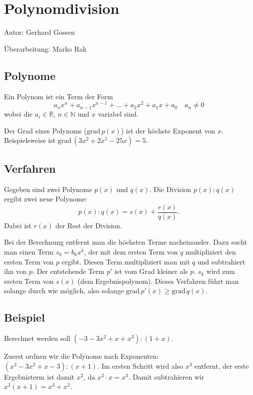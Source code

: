 \newcommand{\grad}{\ensuremath{\text{grad}\,}}
\newcommand{\halb}{\tfrac{1}{2}}
\section{Polynomdivision}

	Autor: Gerhard Gossen
	
\noindent	\"Uberarbeitung: Marko Rak
	
	\subsection{Polynome}
	
		Ein Polynom ist ein Term der Form
		\[a_nx^n + a_{n-1}x^{n-1} + \dots + a_2x^2 + a_1x + a_0 \quad a_n \neq 0\]
		wobei die $a_i \in \mathbb{R}$, $n \in \mathbb{N}$ und $x$ variabel sind.
		
		Der Grad eines Polynoms ($\grad p(x)$) ist der höchste Exponent von
		$x$. Beispielsweise ist $\grad(3x^2+2x^5-25x) = 5$.
		
	\subsection{Verfahren}
		
		Gegeben sind zwei Polynome $p(x)$ und $q(x)$. Die Division
		$p(x) : q(x)$ ergibt zwei neue Polynome:
		\[p(x) : q(x) = s(x) + \frac{r(x)}{q(x)}.\]
		Dabei ist $r(x)$ der \glqq Rest\grqq{} der Division.
		
		Bei der Berechnung entfernt man die höchsten Terme nacheinander. Dazu sucht
		man einen Term $s_k = b_kx^k$, der mit dem ersten Term von $q$ multipliziert
		den ersten Term von $p$ ergibt. Diesen Term multipliziert man mit $q$ und
		subtrahiert ihn von $p$. Der entstehende Term $p'$ ist vom Grad kleiner als
		$p$. $s_k$ wird zum ersten Term von $s(x)$ (dem \glqq Ergebnispolynom\grqq).
		Dieses Verfahren führt man solange durch wie möglich, also solange
		$\grad p'(x) \geq \grad q(x)$.
		
		\subsection{Beispiel}
			Berechnet werden soll $(-3-3x^2+x+x^3):(1+x)$.
			
			Zuerst ordnen wir die Polynome nach Exponenten: $(x^3-3x^2+x-3):(x+1)$. Im
			ersten Schritt wird also $x^3$ entfernt, der erste Ergebnisterm ist damit
			$x^2$, da $x^2\cdot x = x^3$. Damit subtrahieren wir $x^2(x+1) = x^3+x^2$. 
			
